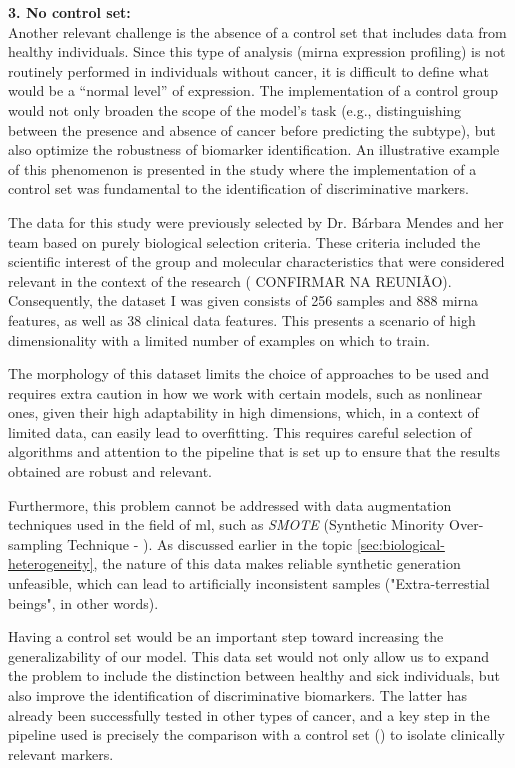 \textbf{3. No control set:} \\
Another relevant challenge is the absence of a control set that includes data
from healthy individuals. Since this type of analysis (\gls{mirna} expression
profiling) is not routinely performed in individuals without cancer, it is
difficult to define what would be a “normal level” of expression. The
implementation of a control group would not only broaden the scope of the
model's task (e.g., distinguishing between the presence and absence of cancer
before predicting the subtype), but also optimize the robustness of biomarker
identification. An illustrative example of this phenomenon is presented in the
study \textcite{ml_gastric_Azari2023} where the implementation of a control set
was fundamental to the identification of discriminative markers.

The data for this study were previously selected by Dr. Bárbara Mendes and her
team based on purely biological selection criteria. These criteria included the
scientific interest of the group and molecular characteristics that were
considered relevant in the context of the research ( CONFIRMAR NA REUNIÃO).
Consequently, the dataset I was given consists of 256 samples and 888
\gls{mirna} features, as well as 38 clinical data features. This presents
a scenario of high dimensionality with a limited number of examples on which to
train.

The morphology of this dataset limits the choice of approaches to be used and
requires extra caution in how we work with certain models, such as nonlinear
ones, given their high adaptability in high dimensions, which, in a context of
limited data, can easily lead to overfitting. This requires careful selection
of algorithms and attention to the pipeline that is set up to ensure that the
results obtained are robust and relevant.

Furthermore, this problem cannot be addressed with data augmentation techniques
used in the field of \gls{ml}, such as \textit{SMOTE} (Synthetic Minority
Over-sampling Technique - \textcite{SMOTE_Blagus2013SMOTE}). As discussed earlier
in the topic \ref{sec:biological-heterogeneity}, the nature of this data makes
reliable synthetic generation unfeasible, which can lead to artificially
inconsistent samples ("Extra-terrestial beings", in other words).

Having a control set would be an important step toward increasing the
generalizability of our model. This data set would not only allow us to expand
the problem to include the distinction between healthy and sick individuals,
but also improve the identification of discriminative biomarkers. The latter
has already been successfully tested in other types of cancer, and a key step
in the pipeline used is precisely the comparison with a control set
(\textcite{ml_gastric_Azari2023}) to isolate clinically relevant markers.

